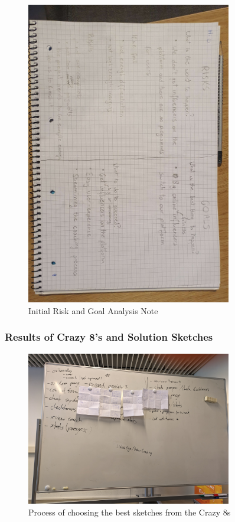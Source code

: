 \begin{figure}[H]
  \centering
  \includegraphics[width=0.8\textwidth]{images/risks_goals_note.jpg}
  \caption{Initial Risk and Goal Analysis Note}
  \label{fig:riskGoalNote}
\end{figure}

\subsubsection{Results of Crazy 8's and Solution Sketches}

\begin{figure}[H]
  \centering
  \includegraphics[width=0.8\textwidth]{images/crazy_8s.jpg}
  \caption{Process of choosing the best sketches from the Crazy 8s}
  \label{fig:crazy8}
\end{figure}

